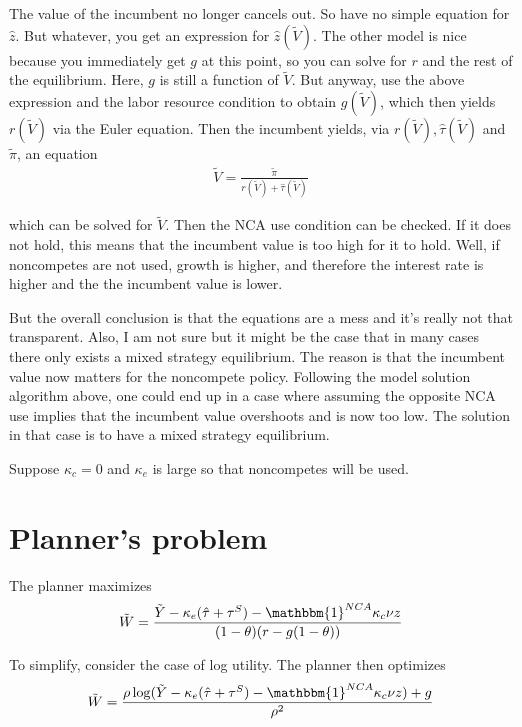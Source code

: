 \documentclass[11pt,english]{article}
\begin{document}
The value of the incumbent no longer cancels out. So have no simple equation for $\hat{z}$. But whatever, you get an expression for $\hat{z}(\tilde{V})$. The other model is nice because you immediately get $g$ at this point, so you can solve for $r$ and the rest of the equilibrium. Here, $g$ is still a function of $\tilde{V}$. But anyway, use the above expression and the labor resource condition to obtain $g(\tilde{V})$, which then yields $r(\tilde{V})$ via the Euler equation. Then the incumbent yields, via $r(\tilde{V}), \hat{\tau}(\tilde{V})$ and $\tilde{\pi}$, an equation
\begin{align}
	\tilde{V} = \frac{\tilde{\pi}}{r(\tilde{V}) + \hat{\tau}(\tilde{V})}
\end{align}

which can be solved for $\tilde{V}$. Then the NCA use condition can be checked. If it does not hold, this means that the incumbent value is too high for it to hold. Well, if noncompetes are not used, growth is higher, and therefore the interest rate is higher and the the incumbent value is lower. 

But the overall conclusion is that the equations are a mess and it's really not that transparent. Also, I am not sure but it might be the case that in many cases there only exists a mixed strategy equilibrium. The reason is that the incumbent value now matters for the noncompete policy. Following the model solution algorithm above, one could end up in a case where assuming the opposite NCA use implies that the incumbent value overshoots and is now too low. The solution in that case is to have a mixed strategy equilibrium. 

Suppose $\kappa_c = 0$ and $\kappa_e$ is large so that noncompetes will be used.  


\section{Planner's problem}

The planner maximizes
\begin{align}
	\tilde{W} = \frac{\tilde{Y} - \kappa_e (\hat{\tau} + \tau^S) - \mathbbm{1}^{NCA} \kappa_c \nu z}{(1-\theta)(r - g(1-\theta))}
\end{align}

To simplify, consider the case of log utility. The planner then optimizes
\begin{align}
	\tilde{W} = \frac{\rho \log (\tilde{Y} - \kappa_e (\hat{\tau} + \tau^S) - \mathbbm{1}^{NCA} \kappa_c \nu z) + g}{\rho^2}
\end{align}
\end{document}
